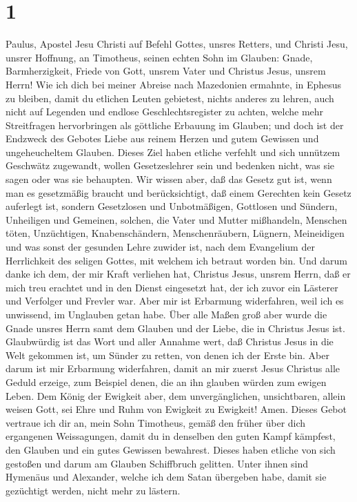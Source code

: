 \hypertarget{section}{%
\section{1}\label{section}}

 Paulus, Apostel Jesu Christi auf Befehl Gottes, unsres
Retters, und Christi Jesu, unsrer Hoffnung,  an Timotheus,
seinen echten Sohn im Glauben: Gnade, Barmherzigkeit, Friede von Gott,
unsrem Vater und Christus Jesus, unsrem Herrn!  Wie ich
dich bei meiner Abreise nach Mazedonien ermahnte, in Ephesus zu bleiben,
damit du etlichen Leuten gebietest, nichts anderes zu lehren,
 auch nicht auf Legenden und endlose Geschlechtsregister
zu achten, welche mehr Streitfragen hervorbringen als göttliche Erbauung
im Glauben;  und doch ist der Endzweck des Gebotes Liebe
aus reinem Herzen und gutem Gewissen und ungeheucheltem Glauben.
 Dieses Ziel haben etliche verfehlt und sich unnützem
Geschwätz zugewandt,  wollen Gesetzeslehrer sein und
bedenken nicht, was sie sagen oder was sie behaupten.  Wir
wissen aber, daß das Gesetz gut ist, wenn man es gesetzmäßig braucht und
berücksichtigt,  daß einem Gerechten kein Gesetz auferlegt
ist, sondern Gesetzlosen und Unbotmäßigen, Gottlosen und Sündern,
Unheiligen und Gemeinen, solchen, die Vater und Mutter mißhandeln,
Menschen töten,  Unzüchtigen, Knabenschändern,
Menschenräubern, Lügnern, Meineidigen und was sonst der gesunden Lehre
zuwider ist,  nach dem Evangelium der Herrlichkeit des
seligen Gottes, mit welchem ich betraut worden bin.  Und
darum danke ich dem, der mir Kraft verliehen hat, Christus Jesus, unsrem
Herrn, daß er mich treu erachtet und in den Dienst eingesetzt hat,
 der ich zuvor ein Lästerer und Verfolger und Frevler
war. Aber mir ist Erbarmung widerfahren, weil ich es unwissend, im
Unglauben getan habe.  Über alle Maßen groß aber wurde
die Gnade unsres Herrn samt dem Glauben und der Liebe, die in Christus
Jesus ist.  Glaubwürdig ist das Wort und aller Annahme
wert, daß Christus Jesus in die Welt gekommen ist, um Sünder zu retten,
von denen ich der Erste bin.  Aber darum ist mir
Erbarmung widerfahren, damit an mir zuerst Jesus Christus alle Geduld
erzeige, zum Beispiel denen, die an ihn glauben würden zum ewigen Leben.
 Dem König der Ewigkeit aber, dem unvergänglichen,
unsichtbaren, allein weisen Gott, sei Ehre und Ruhm von Ewigkeit zu
Ewigkeit! Amen.  Dieses Gebot vertraue ich dir an, mein
Sohn Timotheus, gemäß den früher über dich ergangenen Weissagungen,
damit du in denselben den guten Kampf kämpfest, den Glauben und ein
gutes Gewissen bewahrest.  Dieses haben etliche von sich
gestoßen und darum am Glauben Schiffbruch gelitten. 
Unter ihnen sind Hymenäus und Alexander, welche ich dem Satan übergeben
habe, damit sie gezüchtigt werden, nicht mehr zu lästern.

